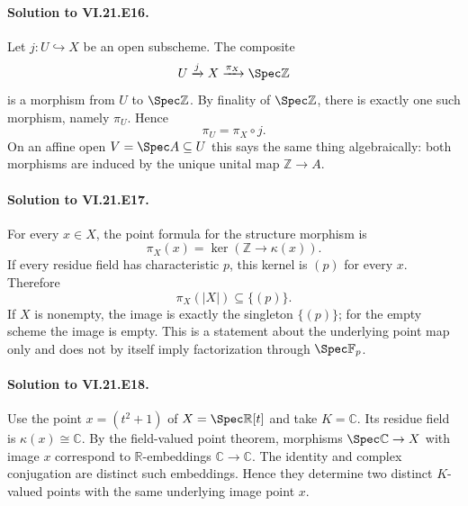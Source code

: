 \paragraph{Solution to VI.21.E16.}
\begin{solution}
Let $j:U\hookrightarrow X$ be an open subscheme.  The composite
\[
U\xrightarrow{j}X\xrightarrow{\pi_X}\Spec\mathbb Z
\]
is a morphism from $U$ to $\Spec\mathbb Z$.  By finality of $\Spec\mathbb Z$, there is exactly one
such morphism, namely $\pi_U$.  Hence
\[
\pi_U=\pi_X\circ j.
\]
On an affine open $V=\Spec A\subseteq U$ this says the same thing algebraically: both morphisms
are induced by the unique unital map $\mathbb Z\to A$.
\end{solution}

\paragraph{Solution to VI.21.E17.}
\begin{solution}
For every $x\in X$, the point formula for the structure morphism is
\[
\pi_X(x)=\ker(\mathbb Z\to\kappa(x)).
\]
If every residue field has characteristic $p$, this kernel is $(p)$ for every $x$.  Therefore
\[
\pi_X(|X|)\subseteq\{(p)\}.
\]
If $X$ is nonempty, the image is exactly the singleton $\{(p)\}$; for the empty scheme the image
is empty.  This is a statement about the underlying point map only and does not by itself imply
factorization through $\Spec\mathbb F_p$.
\end{solution}

\paragraph{Solution to VI.21.E18.}
\begin{solution}
Use the point $x=(t^2+1)$ of $X=\Spec\mathbb R[t]$ and take $K=\mathbb C$.  Its residue
field is $\kappa(x)\cong\mathbb C$.  By the field-valued point theorem, morphisms
$\Spec\mathbb C\to X$ with image $x$ correspond to $\mathbb R$-embeddings
$\mathbb C\to\mathbb C$.  The identity and complex conjugation are distinct such embeddings.
Hence they determine two distinct $K$-valued points with the same underlying image point $x$.
\end{solution}

